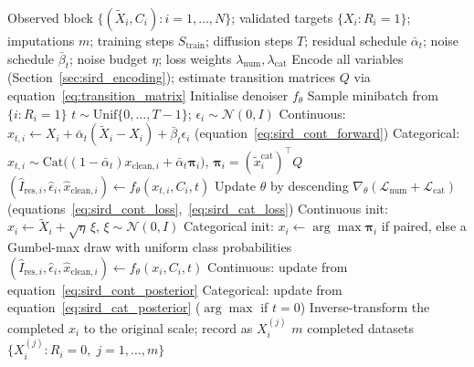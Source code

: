\begin{algorithm}[t]
\caption{Sample imputation via conditional residual denoising diffusion networks (SIRD): base fit and reverse sampler}
\label{alg:sird}
\begin{algorithmic}[1]
\Require Observed block $\{(\tilde X_i,C_i):i=1,\ldots,N\}$; validated targets $\{X_i:R_i=1\}$; imputations $m$; training steps $S_{\text{train}}$; diffusion steps $T$; residual schedule $\bar{\alpha}_t$; noise schedule $\bar{\beta}_t$; noise budget \(\eta\); loss weights $\lambda_{\text{num}}, \lambda_{\text{cat}}$
\Statex
\State Encode all variables (Section~\ref{sec:sird_encoding}); estimate transition matrices $Q$ via equation~\eqref{eq:transition_matrix}
\State Initialise denoiser $f_\theta$
 
    \State Sample minibatch from $\{i : R_i = 1\}$
    \State $t \sim \mathrm{Unif}\{0, \ldots, T-1\}$; $\epsilon_i \sim \mathcal{N}(0,I)$
    \State Continuous: $x_{t,i} \gets X_i + \bar{\alpha}_t(\tilde{X}_i - X_i) + \bar{\beta}_t \epsilon_i$ \hfill (equation~\ref{eq:sird_cont_forward})
    \State Categorical: $x_{t,i} \sim \mathrm{Cat}\bigl((1-\bar{\alpha}_t) x_{\mathrm{clean},i} + \bar{\alpha}_t \boldsymbol{\pi}_i\bigr)$, $\boldsymbol{\pi}_i = (\tilde{x}_i^{\text{cat}})^\top Q$
    \State $(\hat{I}_{\text{res},i}, \hat{\epsilon}_i, \hat{x}_{\mathrm{clean},i}) \gets f_\theta(x_{t,i}, C_i, t)$
    \State Update $\theta$ by descending $\nabla_\theta(\mathcal{L}_{\text{num}} + \mathcal{L}_{\text{cat}})$ \hfill (equations~\ref{eq:sird_cont_loss},~\ref{eq:sird_cat_loss})
\EndFor
\Statex
{} 
        \State Continuous init: $x_i \gets \tilde{X}_i + \sqrt{\eta}\, \xi$, $\xi \sim \mathcal{N}(0,I)$
        \State Categorical init: $x_i \gets \arg\max \boldsymbol{\pi}_i$ if paired, else a Gumbel-max draw with uniform class probabilities
         
            \State $(\hat{I}_{\text{res},i}, \hat{\epsilon}_i, \hat{x}_{\mathrm{clean},i}) \gets f_\theta(x_i, C_i, t)$
            \State Continuous: update from equation~\eqref{eq:sird_cont_posterior}
            \State Categorical: update from equation~\eqref{eq:sird_cat_posterior} ($\arg\max$ if $t=0$)
        \EndFor
        \State Inverse-transform the completed $x_i$ to the original scale; record as $X_i^{(j)}$
    \EndFor
\EndFor
\Ensure $m$ completed datasets $\{X_i^{(j)} : R_i = 0,\; j = 1, \ldots, m\}$
\end{algorithmic}
\end{algorithm}


